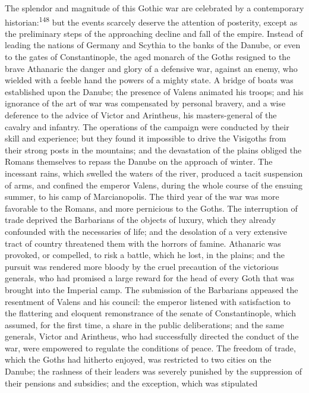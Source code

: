 The splendor and magnitude of this Gothic war are celebrated by a
contemporary historian:\textsuperscript{148} but the events scarcely deserve the
attention of posterity, except as the preliminary steps of the
approaching decline and fall of the empire. Instead of leading
the nations of Germany and Scythia to the banks of the Danube, or
even to the gates of Constantinople, the aged monarch of the
Goths resigned to the brave Athanaric the danger and glory of a
defensive war, against an enemy, who wielded with a feeble hand
the powers of a mighty state. A bridge of boats was established
upon the Danube; the presence of Valens animated his troops; and
his ignorance of the art of war was compensated by personal
bravery, and a wise deference to the advice of Victor and
Arintheus, his masters-general of the cavalry and infantry. The
operations of the campaign were conducted by their skill and
experience; but they found it impossible to drive the Visigoths
from their strong posts in the mountains; and the devastation of
the plains obliged the Romans themselves to repass the Danube on
the approach of winter. The incessant rains, which swelled the
waters of the river, produced a tacit suspension of arms, and
confined the emperor Valens, during the whole course of the
ensuing summer, to his camp of Marcianopolis. The third year of
the war was more favorable to the Romans, and more pernicious to
the Goths. The interruption of trade deprived the Barbarians of
the objects of luxury, which they already confounded with the
necessaries of life; and the desolation of a very extensive tract
of country threatened them with the horrors of famine. Athanaric
was provoked, or compelled, to risk a battle, which he lost, in
the plains; and the pursuit was rendered more bloody by the cruel
precaution of the victorious generals, who had promised a large
reward for the head of every Goth that was brought into the
Imperial camp. The submission of the Barbarians appeased the
resentment of Valens and his council: the emperor listened with
satisfaction to the flattering and eloquent remonstrance of the
senate of Constantinople, which assumed, for the first time, a
share in the public deliberations; and the same generals, Victor
and Arintheus, who had successfully directed the conduct of the
war, were empowered to regulate the conditions of peace. The
freedom of trade, which the Goths had hitherto enjoyed, was
restricted to two cities on the Danube; the rashness of their
leaders was severely punished by the suppression of their
pensions and subsidies; and the exception, which was stipulated
